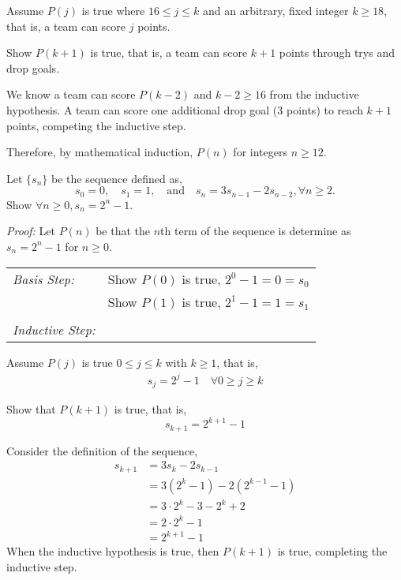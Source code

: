 \begin{questions}
\begin{solution}
  Assume $P(j)$ is true where $16 \leq j \leq k$ and an arbitrary, fixed integer $k \geq 18$, that is, a team can score $j$ points. 

  Show $P(k+1)$ is true, that is, a team can score $k+1$ points through trys and drop goals.

  We know a team can score $P(k-2)$ and $k -2 \geq 16$ from the inductive hypothesis. A team can score one additional drop goal (3 points) to reach $k+1$ points, competing the inductive step. 

  Therefore, by mathematical induction, $P(n)$ for integers $n \geq 12$. 
\end{solution}


 Let $\{s_n\}$ be the sequence defined as, 
\[ s_0 = 0, \quad s_1 = 1,  \quad \text{and} \quad s_n = 3s_{n-1} - 2s_{n-2}, \forall n \geq 2. \]
Show $\forall n \geq 0, s_n = 2^n - 1 .$
    \ifprintanswers
        \vspace{-10pt}
   \fi
\begin{solution}
  \textit{Proof:}
  Let $P(n)$ be that the $n$th term of the sequence is determine as $s_n = 2^n - 1$ for $n \geq 0$.

  \smallskip
  \begin{tabular}{lp{4in}}
    \textit{Basis Step:}  & Show $P(0)$ is true, $2^0 - 1 = 0 = s_0$ \\
                & Show $P(1)$ is true, $2^1 - 1 = 1 = s_1$ \\
     & \\
   \textit{Inductive Step:} &  \\
  \end{tabular}

  Assume $P(j)$ is true $0 \leq j \leq k$ with $k \geq 1$, that is, 
  \begin{align*}
    s_j = 2^j - 1 \quad \forall 0 \geq j \geq k \tag{IH}
  \end{align*}

  Show that $P(k+1)$ is true, that is,
  \[ s_{k+1} = 2^{k+1} - 1 \] 

  Consider the definition of the sequence, 
  \begin{align*}
    s_{k+1} &= 3s_{k} - 2s_{k-1} \\
    &= 3(2^k - 1) - 2(2^{k-1} - 1) \\
    &= 3\cdot 2^k - 3 - 2^k + 2 \\
    &= 2\cdot 2^k - 1 \\
    &= 2^{k+1} - 1
  \end{align*}
  When the inductive hypothesis is true, then $P(k+1)$ is true, completing the inductive step. 


\end{solution}
\end{questions}
